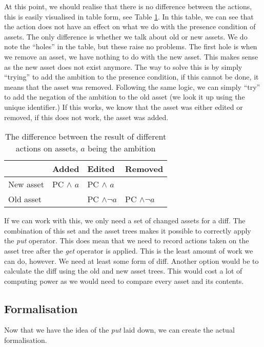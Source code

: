 At this point, we should realise that there is no difference between the
actions, this is easily visualised in table form, see Table \ref{tab:actions}.
In this table, we can see that the action does not have an effect on what
we do with the presence condition of assets. The only difference is whether we
talk about old or new assets. We do note the ``holes'' in the table, but these
raise no problems. The first hole is when we remove an asset, we have nothing
to do with the new asset. This makes sense as the new asset does not exist
anymore. The way to solve this is by simply ``trying'' to add the ambition to
the presence condition, if this cannot be done, it means that the asset was
removed. Following the same logic, we can simply ``try'' to add the negation
of the ambition to the old asset (we look it up using the unique identifier.)
If this works, we know that the asset was either edited or removed, if this
does not work, the asset was added.
\begin{table}
  \centering
  \begin{tabular}{l|lll} 
              & Added          & Edited            & Removed           \\ \hline
    New asset & PC $\land$ $a$ & PC $\land$ $a$    &                   \\ 
    Old asset &                & PC $\land \neg a$ & PC $\land \neg a$
  \end{tabular}
  \caption{The difference between the result of different actions on assets, $a$ being the ambition}
  \label{tab:actions}
\end{table}
If we can work with this, we only need a set of changed assets for a diff. The
combination of this set and the asset trees makes it possible to correctly
apply the \emph{put} operator. This does mean that we need to record actions
taken on the asset tree after the \emph{get} operator is applied. This is the
least amount of work we can do, however. We need at least some form of diff.
Another option would be to calculate the diff using the old and new asset trees.
This would cost a lot of computing power as we would need to compare every
asset and its contents.

\subsection*{Formalisation}
Now that we have the idea of the \emph{put} laid down, we can create the actual
formalisation.

